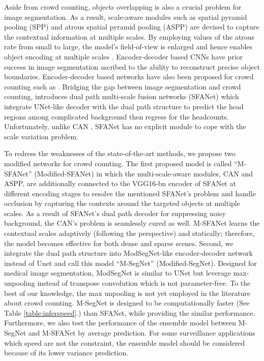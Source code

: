 \documentclass[10pt, conference, a4paper]{IEEEtran}
\begin{document}
Aside from crowd counting, objects overlapping is also a crucial problem for image segmentation. As a result, scale-aware modules such as spatial pyramid pooling (SPP) \cite{he2015spatial} and atrous spatial pyramid pooling (ASPP) \cite{chen2017deeplab} are devised to capture the contextual information at multiple scales. By employing values of the atrous rate from small to large, the model's field-of-view is enlarged and hence enables object encoding at multiple scales \cite{chen2017deeplab}. Encoder-decoder based CNNs \cite{ronneberger2015u, badrinarayanan2017segnet, chen2018encoder} have prior success in image segmentation ascribed to the ability to reconstruct precise object boundaries. Encoder-decoder based networks have also been proposed for crowd counting such as \cite{cao2018scale, wu2019adaptive, li2018csrnet, wang2019learning, liu2019adcrowdnet, xiong2019open}. Bridging the gap between image segmentation and crowd counting, \cite{zhu2019dual} introduces dual path multi-scale fusion networks (SFANet) which integrate UNet\cite{ronneberger2015u}-like decoder with the dual path structure to predict the head regions among complicated background then regress for the headcounts. Unfortunately, unlike CAN \cite{liu2019context}, SFANet has no explicit module to cope with the scale variation problem.

To redress the weaknesses of the state-of-the-art methods, we propose two modified networks for crowd counting. The first proposed model is called ``M-SFANet'' (Modified-SFANet) in which the multi-scale-aware modules, CAN and ASPP, are additionally connected to the VGG16-bn \cite{simonyan2014very} encoder of SFANet at different encoding stages to resolve the mentioned SFANet’s problem and handle occlusion by capturing the contexts around the targeted objects at multiple scales. As a result of SFANet's dual path decoder for suppressing noisy background, the CAN’s problem is seamlessly cured as well. M-SFANet learns the contextual scales adaptively (following the perspective) and statically; therefore, the model becomes effective for both dense and sparse scenes. Second, we integrate the dual path structure into ModSegNet\cite{ganaye2018semi}-like encoder-decoder network instead of Unet and call this model ``M-SegNet'' (Modified-SegNet). Designed for medical image segmentation, ModSegNet is similar to UNet but leverage max-unpooling \cite{badrinarayanan2017segnet} instead of transpose convolution which is not parameter-free. To the best of our knowledge, the max unpooling is not yet employed in the literature about crowd counting. M-SegNet is designed to be computationally faster (See Table \ref{table:inferspeed}.) than SFANet, while providing the similar performance. Furthermore, we also test the performance of the ensemble model between M-SegNet and M-SFANet by average prediction. For some surveillance applications which speed are not the constraint, the ensemble model should be considered because of its lower variance prediction.
\label{intro_para}
\end{document}
